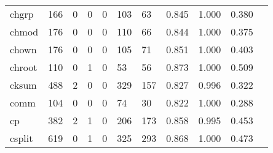 \begin{longtable}{lp{1.10cm}p{1.10cm}p{1.10cm}p{1.10cm}p{1.10cm}p{1.10cm}p{1.10cm}p{1.10cm}p{1.10cm}p{1.10cm}}
chgrp     &                    166 &                                  0 &                                 0 &                                0 &                               103 &                              63 &                          0.845 &                                 1.000 &                               0.380 \\
chmod     &                    176 &                                  0 &                                 0 &                                0 &                               110 &                              66 &                          0.844 &                                 1.000 &                               0.375 \\
chown     &                    176 &                                  0 &                                 0 &                                0 &                               105 &                              71 &                          0.851 &                                 1.000 &                               0.403 \\
chroot    &                    110 &                                  0 &                                 1 &                                0 &                                53 &                              56 &                          0.873 &                                 1.000 &                               0.509 \\
cksum     &                    488 &                                  2 &                                 0 &                                0 &                               329 &                             157 &                          0.827 &                                 0.996 &                               0.322 \\
comm      &                    104 &                                  0 &                                 0 &                                0 &                                74 &                              30 &                          0.822 &                                 1.000 &                               0.288 \\
cp        &                    382 &                                  2 &                                 1 &                                0 &                               206 &                             173 &                          0.858 &                                 0.995 &                               0.453 \\
csplit    &                    619 &                                  0 &                                 1 &                                0 &                               325 &                             293 &                          0.868 &                                 1.000 &                               0.473 \\

\end{longtable}
